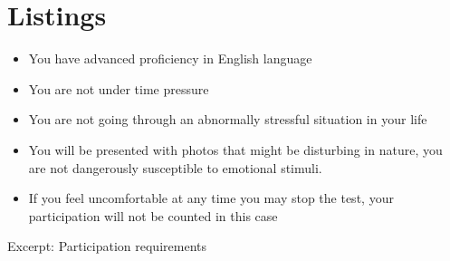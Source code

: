 \section{Listings}


\begin{listing}[ht!]
\begin{itemize}
	\item You have advanced proficiency in English language
	\item You are not under time pressure
	\item You are not going through an abnormally stressful situation in
	your life
	\item You will be presented with photos that might be disturbing in
	nature, you are not dangerously susceptible to emotional stimuli.
	\item If you feel uncomfortable at any time you may stop the test, your
	participation will not be counted in this case
\end{itemize}

\label{itm:participation_requirements}
\caption{Excerpt: Participation requirements}
\end{listing}


